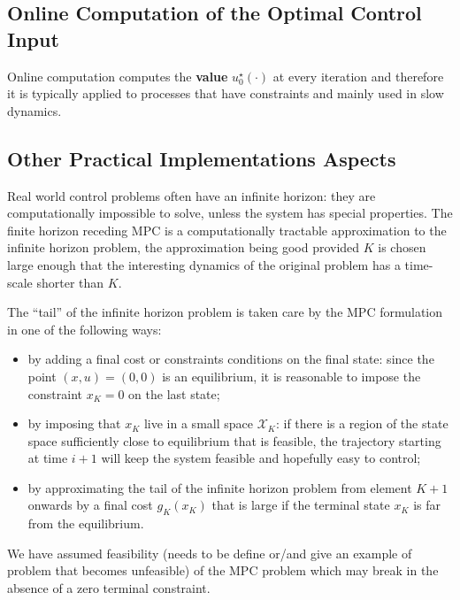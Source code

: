 \subsection{Online Computation of the Optimal Control Input}
\label{sec:online-computation-MPC}

Online computation computes the \textbf{value} $u_0^\star(\cdot)$ at every iteration and therefore it is typically applied to processes that have constraints and mainly used in slow dynamics.

\subsection{Other Practical Implementations Aspects}
\label{sec:other-practical-implementation-aspects}

Real world control problems often have an infinite horizon: they are computationally impossible to solve, unless the system has special properties. The finite horizon receding MPC is a computationally tractable approximation to the infinite horizon problem, the approximation being good provided $K$ is chosen large enough that the interesting dynamics of the original problem has a time-scale shorter than $K$.

The ``tail'' of the infinite horizon problem is taken care by the MPC formulation in one of the following ways:
\begin{itemize}
\item by adding a final cost or constraints conditions on the final state: since the point $(x,u)=(0,0)$ is an equilibrium, it is reasonable to impose the constraint $x_K=0$ on the last state;
\item by imposing that $x_K$ live in a small space $\mathcal{X}_K$: if there is a region of the state space sufficiently close to equilibrium that is feasible, the trajectory starting at time $i+1$ will keep the system feasible and hopefully easy to control;
\item by approximating the tail of the infinite horizon problem from element $K+1$ onwards by a final cost $g_K(x_K)$ that is large if the terminal state $x_K$ is far from the equilibrium.
\end{itemize}

We have assumed feasibility (needs to be define or/and give an example of problem that becomes unfeasible) of the MPC problem which may break in the absence of a zero terminal constraint.

